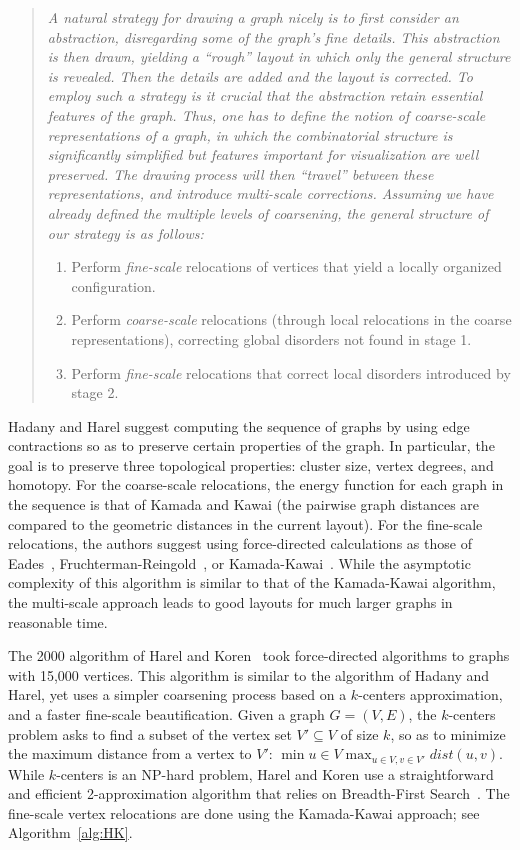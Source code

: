 \documentclass[notitlepage,letter,11pt]{article}
\begin{document}
\begin{quote}
{\em
A natural strategy for drawing a graph nicely is to first consider an abstraction, disregarding some of the graph's fine details. This abstraction is then drawn, yielding a ``rough'' layout in which only the general structure is revealed. Then the details are added and the layout is corrected. To employ such a strategy is it crucial that the abstraction retain essential features of the graph. Thus, one has to define the notion of coarse-scale representations of a graph, in which the combinatorial structure is significantly simplified but features important for visualization are well preserved. The drawing process will then ``travel'' between these representations, and introduce multi-scale corrections. Assuming we have already defined the multiple levels of coarsening, the general structure of our strategy is as follows:
\begin{enumerate}
\item Perform {\em fine-scale} relocations of vertices that yield a locally organized configuration.
\item Perform {\em coarse-scale} relocations (through local relocations in the coarse representations), correcting global disorders not found in stage 1.
\item Perform {\em fine-scale} relocations that correct local disorders introduced by stage 2.
\end{enumerate}
}\end{quote}

Hadany and Harel suggest computing the sequence of graphs by using
edge contractions so as to preserve certain properties of the
graph. In particular, the goal is to preserve three topological
properties: cluster size, vertex degrees, and homotopy. For the
coarse-scale relocations, the energy function for each graph in the
sequence is that of Kamada and Kawai (the pairwise graph distances are
compared to the geometric distances in the current layout). For the
fine-scale relocations, the authors suggest using force-directed
calculations as those of Eades~\cite{Eades+1984a},
Fruchterman-Reingold~\cite{fr-gdfdp-91}, or
Kamada-Kawai~\cite{kk-adgug-89}. While the asymptotic complexity of
this algorithm is similar to that of the Kamada-Kawai algorithm, the
multi-scale approach leads to good layouts for much larger graphs in
reasonable time. 

The 2000 algorithm of Harel and Koren~\cite{hk-fmsmd-j-02} took
force-directed algorithms to graphs with 15,000 vertices. This
algorithm is similar to the algorithm of Hadany and Harel, yet uses a
simpler coarsening process based on a $k$-centers approximation, and a
faster fine-scale beautification. Given a graph $G=(V,E)$, the
$k$-centers problem asks to find a subset of the vertex set
$V'\subseteq V$ of size $k$, so as to minimize the maximum distance
from a vertex to $V'$: $\min{u\in V}\max_{u\in V, v\in V'} dist(u,v)$.
While $k$-centers is an NP-hard problem, Harel and Koren use a
straightforward and efficient 2-approximation algorithm that relies on
Breadth-First Search~\cite{Hochbaum-96}. The fine-scale vertex
relocations are done using the Kamada-Kawai approach; see Algorithm~\ref{alg:HK}.
\end{document}
